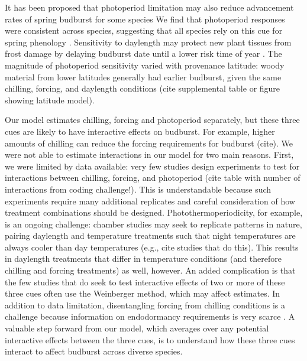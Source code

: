 \documentclass[11pt,letter]{article}
\begin{document}
\par It has been proposed that photoperiod limitation may also reduce advancement rates of spring budburst for some species \citep{koerner2010a} We find that photoperiod responses were consistent across species, suggesting that all species rely on this cue for spring phenology \citep{zohner2016, flynn2018,Caffarra:2011a}. Sensitivity to daylength may protect new plant tissues from frost damage by delaying budburst date until a lower risk time of year \citep{koerner2010a}. The magnitude of photoperiod sensitivity varied with provenance latitude: woody material from lower latitudes generally had earlier budburst, given the same chilling, forcing, and daylength conditions (cite supplemental table or figure showing latitude model). %



\par Our model estimates chilling, forcing and photoperiod separately, but these three cues are likely to have interactive effects on budburst. For example, higher amounts of chilling can reduce the forcing requirements for budburst (cite). We were not able to estimate interactions in our model for two main reasons. First, we were limited by data available: very few studies design experiments to test for interactions between chilling, forcing, and photoperiod (cite table with number of interactions from coding challenge!). This is understandable because such experiments require many additional replicates and careful consideration of how treatment combinations should be designed. Photothermoperiodicity, for example, is an ongoing challenge: chamber studies may seek to replicate patterns in nature, pairing daylength and temperature treatments such that night temperatures are always cooler than day temperatures (e.g., cite studies that do this).  This results in daylength treatments that differ in temperature conditions (and therefore chilling and forcing treatments) as well, however.  An added complication is that the few studies that do seek to test interactive effects of two or more of these three cues often use the Weinberger method, which may affect estimates. In addition to data limitation, disentangling forcing from chilling conditions is a challenge because information on endodormancy requirements is very scarce \citep{chuine2016}.%
A valuable step forward from our model, which averages over any potential interactive effects between the three cues, is to understand how these three cues interact to affect budburst across diverse species.
\end{document}
